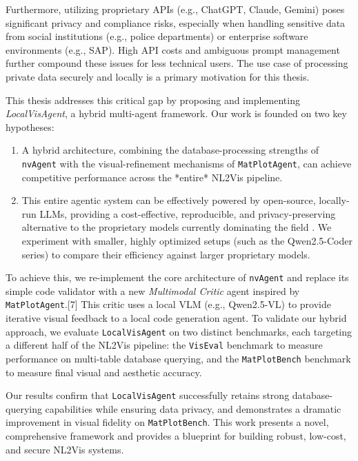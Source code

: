 \documentclass[a4paper,oneside,bibliography=totoc]{scrbook}
\begin{document}
Furthermore, utilizing proprietary APIs (e.g., ChatGPT, Claude, Gemini) poses significant privacy and compliance risks, especially when handling sensitive data from social institutions (e.g., police departments) or enterprise software environments (e.g., SAP). High API costs and ambiguous prompt management further compound these issues for less technical users. The use case of processing private data securely and locally is a primary motivation for this thesis.

This thesis addresses this critical gap by proposing and implementing \emph{LocalVisAgent}, a hybrid multi-agent framework. Our work is founded on two key hypotheses:
\begin{enumerate}
 \item A hybrid architecture, combining the database-processing strengths of \texttt{nvAgent} with the visual-refinement mechanisms of \texttt{MatPlotAgent}, can achieve competitive performance across the *entire* NL2Vis pipeline.
 \item This entire agentic system can be effectively powered by open-source, locally-run LLMs, providing a cost-effective, reproducible, and privacy-preserving alternative to the proprietary models currently dominating the field \cite{[7, 24]}. We experiment with smaller, highly optimized setups (such as the Qwen2.5-Coder series) to compare their efficiency against larger proprietary models.
\end{enumerate}

To achieve this, we re-implement the core architecture of \texttt{nvAgent} and replace its simple code validator with a new \emph{Multimodal Critic} agent inspired by \texttt{MatPlotAgent}.[7] This critic uses a local VLM (e.g., Qwen2.5-VL) to provide iterative visual feedback to a local code generation agent. To validate our hybrid approach, we evaluate \texttt{LocalVisAgent} on two distinct benchmarks, each targeting a different half of the NL2Vis pipeline: the \texttt{VisEval} benchmark \cite{ouyang2025nvagent} to measure performance on multi-table database querying, and the \texttt{MatPlotBench} benchmark \cite{yang2024matplotagent} to measure final visual and aesthetic accuracy.

Our results confirm that \texttt{LocalVisAgent} successfully retains strong database-querying capabilities while ensuring data privacy, and demonstrates a dramatic improvement in visual fidelity on \texttt{MatPlotBench}. This work presents a novel, comprehensive framework and provides a blueprint for building robust, low-cost, and secure NL2Vis systems.
\end{document}
